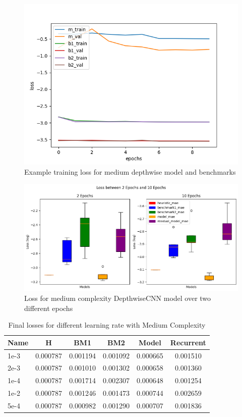 \begin{figure}[tbph]
	\centering
	\includegraphics[width=0.6\linewidth, height=0.6\textheight]{Figures/Results/Diff_Complexity_Lr_Epochs/Epochs_Lr/medium_depthwise_diff_train_2_custom_mae_weighted_2e-3_more_epochs_norm_independant_292_training}
	\caption[Example Loss for Medium depthwise model and benchmarks]{Example training loss for medium depthwise model and benchmarks}
	\label{fig:egloss-epochs}
\end{figure}


\begin{figure}[tbph]
	\centering
	\includegraphics[width=0.8\linewidth, height=0.3\textheight]{Figures/Results/Diff_Complexity_Lr_Epochs/Epochs_Lr/Box_epochs}
	\caption[Loss between two different Epochs]{Loss for medium complexity DepthwiseCNN model over two different epochs}
	\label{fig:epochs}
\end{figure}

\begin{table}[htbp]
	\centering
	\caption{Final losses for different learning rate with Medium Complexity}
	\label{tab:lr}
	\begin{tabular}{p{2cm}ccccc}
		\toprule
		Name &  H &  BM1 &  BM2 &  Model &  Recurrent \\
		\midrule
		1e-3 &       0.000787 &        0.001194 &        0.001092 &   0.000665 &            0.001510 \\
		2e-3 &       0.000787 &        0.001010 &        0.001302 &   0.000658 &            0.001360 \\
		1e-4 &       0.000787 &        0.001714 &        0.002307 &   0.000648 &            0.001254 \\
		1e-2 &       0.000787 &        0.001246 &        0.001473 &   0.000744 &            0.002659 \\
		5e-4 &       0.000787 &        0.000982 &        0.001290 &   0.000707 &            0.001836 \\
		\bottomrule
	\end{tabular}
\end{table}

